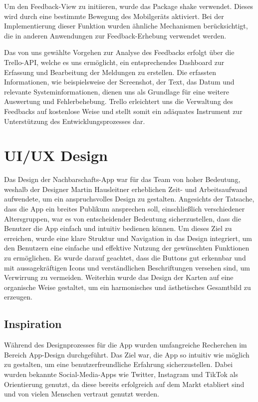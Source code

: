 Um den Feedback-View zu initiieren, wurde das Package
\cite{shake} shake verwendet.
Dieses wird durch eine bestimmte Bewegung des Mobilgeräts aktiviert. Bei der Implementierung dieser Funktion wurden ähnliche Mechanismen berücksichtigt, die in anderen Anwendungen zur Feedback-Erhebung verwendet werden.

Das von uns gewählte Vorgehen zur Analyse des Feedbacks erfolgt über die Trello-API, welche es uns ermöglicht, ein entsprechendes Dashboard zur Erfassung und Bearbeitung der Meldungen zu erstellen. Die erfassten Informationen, wie beispielsweise der Screenshot, der Text, das Datum und relevante Systeminformationen, dienen uns als Grundlage für eine weitere Auswertung und Fehlerbehebung. Trello erleichtert uns die Verwaltung des Feedbacks auf kostenlose Weise und stellt somit ein adäquates Instrument zur Unterstützung des Entwicklungsprozesses dar.


\section{UI/UX Design}
Das Design der Nachbarschafts-App war für das Team von hoher Bedeutung, weshalb der Designer Martin Hausleitner erheblichen Zeit- und Arbeitsaufwand aufwendete, um ein anspruchsvolles Design zu gestalten. Angesichts der Tatsache, dass die App ein breites Publikum ansprechen soll, einschließlich verschiedener Altersgruppen, war es von entscheidender Bedeutung sicherzustellen, dass die Benutzer die App einfach und intuitiv bedienen können. Um dieses Ziel zu erreichen, wurde eine klare Struktur und Navigation in das Design integriert, um den Benutzern eine einfache und effektive Nutzung der gewünschten Funktionen zu ermöglichen. Es wurde darauf geachtet, dass die Buttons gut erkennbar und mit aussagekräftigen Icons und verständlichen Beschriftungen versehen sind, um Verwirrung zu vermeiden. Weiterhin wurde das Design der Karten auf eine organische Weise gestaltet, um ein harmonisches und ästhetisches Gesamtbild zu erzeugen.
\subsection{Inspiration}
Während des Designprozesses für die App wurden umfangreiche Recherchen im Bereich App-Design durchgeführt. Das Ziel war, die App so intuitiv wie möglich zu gestalten, um eine benutzerfreundliche Erfahrung sicherzustellen. Dabei wurden bekannte Social-Media-Apps wie Twitter\cite{twitter}, Instagram\cite{instagram} und TikTok\cite{tiktok} als Orientierung genutzt, da diese bereits erfolgreich auf dem Markt etabliert sind und von vielen Menschen vertraut genutzt werden.

